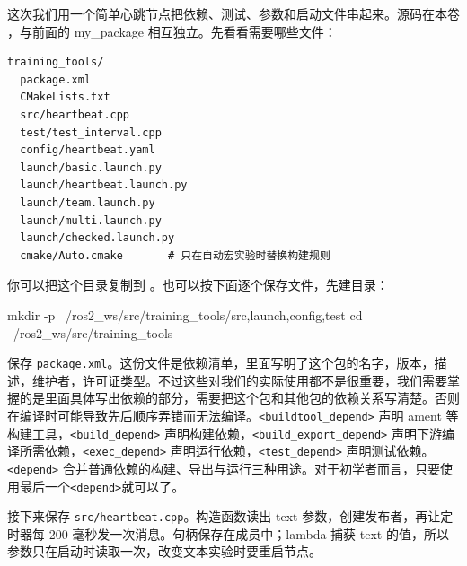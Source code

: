 \begin{example}[建立共用教学包]
这次我们用一个简单心跳节点把依赖、测试、参数和启动文件串起来。源码在本卷 ，与前面的 my\_package 相互独立。先看看需要哪些文件：
\par\medskip\noindent\begin{minipage}{\linewidth}
\begin{lstlisting}[language={}]
training_tools/
  package.xml
  CMakeLists.txt
  src/heartbeat.cpp
  test/test_interval.cpp
  config/heartbeat.yaml
  launch/basic.launch.py
  launch/heartbeat.launch.py
  launch/team.launch.py
  launch/multi.launch.py
  launch/checked.launch.py
  cmake/Auto.cmake       # 只在自动宏实验时替换构建规则
\end{lstlisting}
\end{minipage}\par\smallskip
你可以把这个目录复制到 。也可以按下面逐个保存文件，先建目录：
\par\medskip\noindent\begin{minipage}{\linewidth}
\begin{tbash}
mkdir -p ~/ros2_ws/src/training_tools/{src,launch,config,test}
cd ~/ros2_ws/src/training_tools
\end{tbash}
\end{minipage}\par\smallskip
保存 \texttt{package.xml}。这份文件是依赖清单，里面写明了这个包的名字，版本，描述，维护者，许可证类型。不过这些对我们的实际使用都不是很重要，我们需要掌握的是里面具体写出依赖的部分，需要把这个包和其他包的依赖关系写清楚。否则在编译时可能导致先后顺序弄错而无法编译。\nolinkurl{<buildtool_depend>} 声明 ament 等构建工具，\nolinkurl{<build_depend>} 声明构建依赖，\nolinkurl{<build_export_depend>} 声明下游编译所需依赖，\nolinkurl{<exec_depend>} 声明运行依赖，\nolinkurl{<test_depend>} 声明测试依赖。\nolinkurl{<depend>} 合并普通依赖的构建、导出与运行三种用途。对于初学者而言，只要使用最后一个\nolinkurl{<depend>}就可以了。
\par\medskip\noindent\begin{minipage}{\linewidth}

\end{minipage}\par\smallskip
接下来保存 \nolinkurl{src/heartbeat.cpp}。构造函数读出 text 参数，创建发布者，再让定时器每 200 毫秒发一次消息。句柄保存在成员中；lambda 捕获 text 的值，所以参数只在启动时读取一次，改变文本实验时要重启节点。

\end{example}
